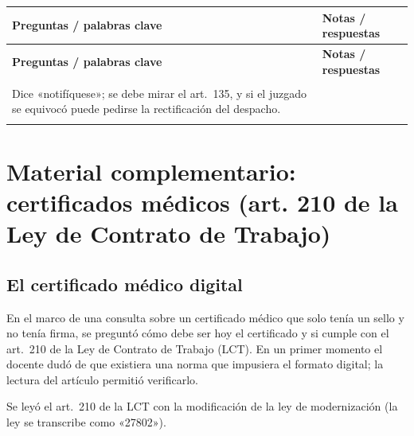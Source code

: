 \documentclass[12pt,oneside]{book}
\newlength{\cornellizq}
\newlength{\cornellder}
\newenvironment{cornell}
{\begin{longtable}{>{\columncolor{gray!10}\raggedright\arraybackslash}p{\cornellizq}>{\raggedright\arraybackslash}p{\cornellder}}
\toprule
\textbf{Preguntas / palabras clave} & \textbf{Notas / respuestas} \\
\midrule
\endfirsthead
\toprule
\textbf{Preguntas / palabras clave} & \textbf{Notas / respuestas} \\
\midrule
\endhead
\midrule
\multicolumn{2}{r}{\footnotesize\itshape Continúa en la página siguiente} \\
\endfoot
\endlastfoot}
{\end{longtable}}
\begin{document}
\begin{cornell}
Dice «notifíquese»; se debe mirar el art.~135, y si el juzgado se equivocó puede pedirse la rectificación del despacho. \\
\addlinespace
\midrule
\rowcolor{blue!5}
\multicolumn{2}{>{\raggedright\arraybackslash}p{\dimexpr\cornellizq+\cornellder+2\tabcolsep\relax}}{%
\textbf{Resumen.} En el caso 1, el traslado del acuse de negligencia se notifica por ministerio de la ley (viernes 7 de agosto si el expediente está en letra) y puede resistirse argumentando que, según el art.~469, el reemplazo del perito corresponde al juez de oficio, en el marco de sus facultades instructorias. En el caso 2, se distingue la negligencia (que se sustancia) de la caducidad (automática), y se advierte que el despacho «notifíquese» debe examinarse a la luz del art.~135.} \\
\bottomrule
\end{cornell}

\chapter[Material complementario]{Material complementario: certificados médicos (art. 210 de la Ley de Contrato de Trabajo)}

\section{El certificado médico digital}

En el marco de una consulta sobre un certificado médico que solo tenía un sello y no tenía firma, se preguntó cómo debe ser hoy el certificado y si cumple con el art.~210 de la Ley de Contrato de Trabajo (LCT). En un primer momento el docente dudó de que existiera una norma que impusiera el formato digital; la lectura del artículo permitió verificarlo.

Se leyó el art.~210 de la LCT con la modificación de la ley de modernización (la ley se transcribe como «27802»).
\end{document}
